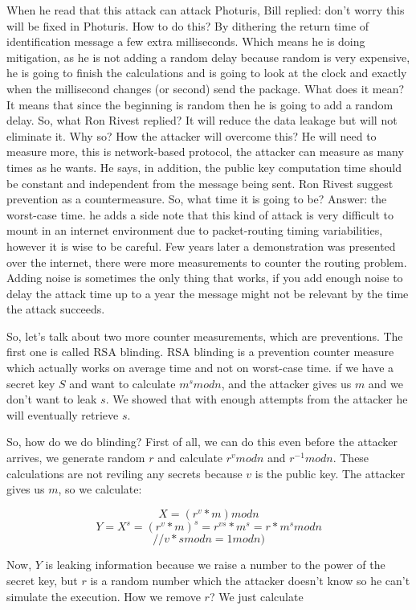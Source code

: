 When he read that this attack can attack Photuris, Bill replied: don't worry
this will be fixed in Photuris. How to do this? By dithering the return time of
identification message a few extra milliseconds. Which means he is doing
mitigation, as he is not adding a random delay because random is very expensive, he
is going to finish the calculations and is going to look at the clock and
exactly when the millisecond changes (or second) send the package. What does it
mean? It means that since the beginning is random then he is going to add a random
delay. So, what Ron Rivest replied? It will reduce the data leakage but will not
eliminate it. Why so? How the attacker will overcome this? He will need
to measure more, this is network-based protocol, the attacker can measure as 
many times as he wants. He says, in addition, the public key computation time should be
constant and independent from the message being sent. Ron Rivest suggest
prevention as a countermeasure. So, what time it is going to be? Answer: the
worst-case time. he adds a side note that this kind of attack is very difficult
to mount in an internet environment due to packet-routing timing variabilities,
however it is wise to be careful. Few years later a demonstration was presented
over the internet, there were more measurements to counter the routing problem.
Adding noise is sometimes the only thing that works, if you add enough noise to
delay the attack time up to a year the message might not be relevant by the time the attack succeeds.

So, let's talk about two more counter measurements, which are preventions. The first
one is called RSA blinding. RSA blinding is a prevention counter measure which
actually works on average time and not on worst-case time. if we have a secret key $S$ and
want to calculate \(m^s mod n\), and the attacker gives us $m$ and we don't want
to leak $s$. We showed that with enough attempts from the attacker he will eventually
retrieve $s$. 

So, how do we do blinding? First of all, we can do this even before the attacker
arrives, we generate random $r$ and calculate \(r^v mod n\) and \(r^{-1} mod
n\). These calculations are not reviling any secrets because $v$ is the public
key. The attacker gives us $m$, so we calculate: 

\[X = (r^v * m) mod n\]
\[Y = X^s = (r^v*m)^s = r^{vs}*m^s = r*m^s mod n \] 
\[ // v*s mod n = 1 mod n)\]

Now, $Y$ is leaking information because we raise a number to the power of the
secret key, but $r$ is a random number which the attacker doesn't know so he can't
simulate the execution. How we remove $r$? We just calculate 

